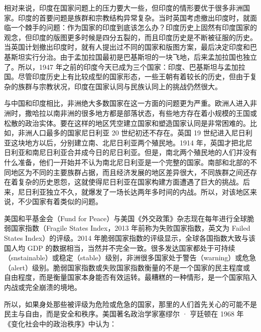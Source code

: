 相对来说，印度在国家问题上的压力要大一些，但印度的情形要优于很多非洲国家。印度的首要问题是族群和宗教结构异常复杂。当时英国考虑撤出印度时，就面临一个棘手的问题：作为国家的印度到底该怎么办？印度历史上固然有印度国家的观念，但印度的版图更多时候是四分五裂的，而且印度历史是不断被征服的历史。当英国计划撤出印度时，就有人提出过不同的国家和版图方案，最后决定印度和巴基斯坦实行分治。由于孟加拉国最初是巴基斯坦的一块飞地，后来孟加拉国也独立了。所以，1947 年之前的印度今天已成为三个国家：印度、巴基斯坦与孟加拉国。尽管印度历史上有比较成型的国家形态，一些王朝有着较长的历史，但由于复杂的族群与宗教状况，印度在国家认同与民族认同上的挑战仍然很大。

与中国和印度相比，非洲绝大多数国家在这一方面的问题更为严重。欧洲人进入非洲时，撒哈拉以南非洲的很多地方都是部落状态，有些地方存在着小规模的王国或松散的政治实体。要在这样的地区凭空建立国家和塑造国家认同是非常困难的。比如，非洲人口最多的国家尼日利亚 20 世纪初还不存在。英国 19 世纪进入尼日利亚这块地方以后，分别建立南、北尼日利亚两个殖民地。1914 年，英国才把北尼日利亚和南尼日利亚合并成今日的尼日利亚。但是，南北两个殖民地的人们并没有什么准备，他们一开始并不认为南北尼日利亚是一个完整的国家。南部和北部的不同地区为不同的主要族群占据，而且经济发展的地区差异很大，不同族群之间还存在着复杂的历史恩怨，这就使得尼日利亚在国家构建方面遭遇了巨大的挑战。后来，尼日利亚独立不久，就爆发了一场长达两年多时间的内战。所以，对该地区来说，不少国家有着类似的问题。

美国和平基金会（Fund for Peace）与美国《外交政策》杂志现在每年进行全球脆弱国家指数（Fragile States Index，2013 年前称为失败国家指数，英文为 Failed States Index）的评级。2014 年脆弱国家指数的评级显示，全球各国指数大致与该国人均 GDP 的数据相当，当然并不完全一致。很多发达国家都处于可持续（snstainable）或稳定（stable）级别，非洲很多国家处于警告（warning）或危急（alert）级别。脆弱国家指数或失败国家指数衡量的不是一个国家的民主程度或自由程度，而是衡量国家本身能否有效运转。最糟糕的一种情形，是一个国家陷入内战或完全崩溃的境地。

所以，如果身处那些被评级为危险或危急的国家，那里的人们首先关心的可能不是民主与自由，而是安全和秩序。美国著名政治学家塞缪尔 · 亨廷顿在 1968 年《变化社会中的政治秩序》中认为：


